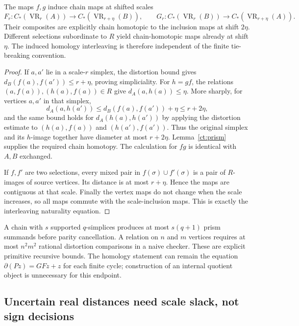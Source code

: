 \begin{theorem}
\label{ct:rips}
The maps $f,g$ induce chain maps at shifted scales
\[
 F_r:C_*(\operatorname{VR}_r(A))\longrightarrow
           C_*(\operatorname{VR}_{r+\eta}(B)),\qquad
 G_r:C_*(\operatorname{VR}_r(B))\longrightarrow
           C_*(\operatorname{VR}_{r+\eta}(A)).
\]
Their composites are explicitly chain homotopic to the inclusion maps at
shift $2\eta$. Different selections subordinate to $R$ yield chain-homotopic
maps already at shift $\eta$. The induced homology interleaving is therefore
independent of the finite tie-breaking convention.
\end{theorem}
\begin{proof}
If $a,a'$ lie in a scale-$r$ simplex, the distortion bound gives
$d_B(f(a),f(a'))\leq r+\eta$, proving simpliciality.
For $h=gf$, the relations $(a,f(a)),(h(a),f(a))\in R$ give
$d_A(a,h(a))\leq\eta$. More sharply, for vertices $a,a'$ in that simplex,
\[
 d_A(a,h(a'))\leq d_B(f(a),f(a'))+\eta\leq r+2\eta,
\]
and the same bound holds for $d_A(h(a),h(a'))$ by applying the distortion
estimate to $(h(a),f(a))$ and $(h(a'),f(a'))$.
Thus the original simplex and its $h$-image together have diameter at most
$r+2\eta$. Lemma~\ref{ct:prism} supplies the required chain homotopy.
The calculation for $fg$ is identical with $A,B$ exchanged.

If $f,f'$ are two selections, every mixed pair in
$f(\sigma)\cup f'(\sigma)$ is a pair of $R$-images of source vertices.
Its distance is at most $r+\eta$. Hence the maps are contiguous at that
scale. Finally the vertex maps do not change when the scale increases,
so all maps commute with the scale-inclusion maps. This is exactly the
interleaving naturality equation.\end{proof}

A chain with $s$ supported $q$-simplices produces at most $s(q+1)$ prism
summands before parity cancellation. A relation on $n$ and $m$ vertices
requires at most $n^2m^2$ rational distortion comparisons in a naive
checker. These are explicit primitive recursive bounds. The homology
statement can remain the equation
$\partial(Pz)=GFz+z$ for each finite cycle; construction of an internal
quotient object is unnecessary for this endpoint.

\subsection{Uncertain real distances need scale slack, not sign decisions}


